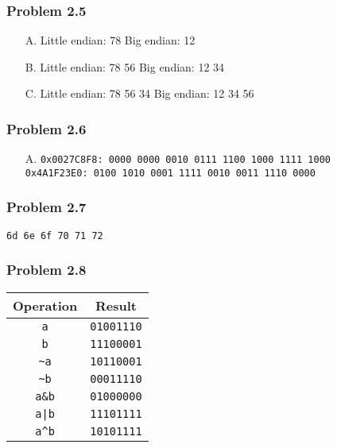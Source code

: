 \documentclass[a4paper]{article}
\begin{document}
\subsubsection*{Problem 2.5}
\begin{enumerate}
    \item [A.] Little endian: 78 Big endian: 12
    \item [B.] Little endian: 78 56 Big endian: 12 34
    \item [C.] Little endian: 78 56 34 Big endian: 12 34 56
\end{enumerate}

\subsubsection*{Problem 2.6}
\begin{enumerate}
    \item [A.] \texttt{0x0027C8F8: 0000 0000 0010 0111 1100 1000 1111 1000}\\
               \texttt{0x4A1F23E0: 0100 1010 0001 1111 0010 0011 1110 0000}
\end{enumerate}

\subsubsection*{Problem 2.7}
\texttt{6d 6e 6f 70 71 72}

\subsubsection*{Problem 2.8}
\begin{tabular}{cc}
    Operation                    &Result\\
    \hline
    \texttt{a}                   &\texttt{01001110}\\
    \texttt{b}                   &\texttt{11100001}\\
    \texttt{\textasciitilde a}   &\texttt{10110001}\\
    \texttt{\textasciitilde b}   &\texttt{00011110}\\
    \texttt{a\&b}                &\texttt{01000000}\\
    \texttt{a|b}                 &\texttt{11101111}\\
    \texttt{a\^{}b}              &\texttt{10101111}
\end{tabular}

\end{document}
